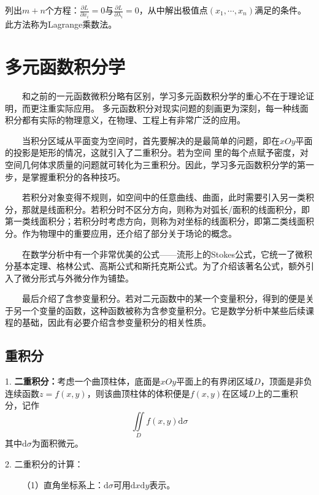 列出$m+n$个方程：$\frac{\partial L}{\partial x_i}=0$与$\frac{\partial L}{\partial \lambda_i}=0$，从中解出极值点$(x_1,\cdots,x_n)$满足的条件。此方法称为Lagrange乘数法。

\section{多元函数积分学}

\begin{tcolorbox}[colback=red!5,colframe=red!75!black]
    ~~~~和之前的一元函数微积分略有区别，学习多元函数积分学的重心不在于理论证明，而更注重实际应用。
   多元函数积分对现实问题的刻画更为深刻，每一种线面积分都有实际的物理意义，在物理、工程上有非常广泛的应用。

    ~~~~当积分区域从平面变为空间时，首先要解决的是最简单的问题，即在$xOy$平面的投影是矩形的情况，这就引入了二重积分。若为空间
    里的每个点赋予密度，对空间几何体求质量的问题就可转化为三重积分。因此，学习多元函数积分学的第一步，是掌握重积分的各种技巧。

    ~~~~若积分对象变得不规则，如空间中的任意曲线、曲面，此时需要引入另一类积分，那就是线面积分。若积分时不区分方向，则称为对弧长/面积的线面积分，即
    第一类线面积分；若积分时考虑方向，则称为对坐标的线面积分，即第二类线面积分。作为物理中的重要应用，还介绍了部分关于场论的概念。

    ~~~~在数学分析中有一个非常优美的公式——流形上的Stokes公式，它统一了微积分基本定理、格林公式、高斯公式和斯托克斯公式。为了介绍该著名公式，额外引入了微分形式与外微分作为铺垫。

    ~~~~最后介绍了含参变量积分。若对二元函数中的某一个变量积分，得到的便是关于另一个变量的函数，这种函数被称为含参变量积分。它是数学分析中某些后续课程的基础，因此有必要介绍含参变量积分的相关性质。
\end{tcolorbox}

\subsection{重积分}

1. \textbf{二重积分：}考虑一个曲顶柱体，底面是$xOy$平面上的有界闭区域$D$，顶面是非负连续函数$z=f(x,y)$，则该曲顶柱体的体积便是$f(x,y)$在区域$D$上的二重积分，记作
\begin{equation*}
    \iint\limits_D f(x,y)\mathrm{d} \sigma
\end{equation*}
其中$\mathrm{d}\sigma$为面积微元。

2. 二重积分的计算：

~~~~（1）直角坐标系上：$\mathrm{d}\sigma$可用$\mathrm{d}x\mathrm{d}y$表示。

